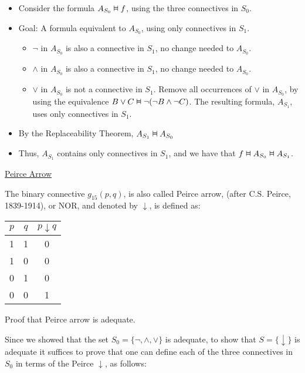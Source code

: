 \documentclass{article}
\newcommand{\vDashv}{%
  \mathrel{%
    \text{%
      \ooalign{$\vDash$\cr\reflectbox{$\vDash$}\cr}%
    }%
  }%
}
\begin{document}
\begin{itemize}
    \item Consider the formula $A_{S_0} \vDashv f$, using the three connectives in $S_0$.
    \item Goal: A formula equivalent to $A_{S_0}$, using only connectives in $S_1$.
        \begin{itemize}
        \item $\neg$ in $A_{S_0}$ is also a connective in $S_1$, no change needed to $A_{S_0}$.
        \item $\wedge$ in $A_{S_0}$ is also a connective in $S_1$, no change needed to $A_{S_0}$.
        \item $\vee$ in $A_{S_0}$ is not a connective in $S_1$. Remove all occurrences of $\vee$ in $A_{S_0}$, by using the equivalence $B \vee C \vDashv \neg(\neg B \wedge \neg C)$. The resulting formula, $A_{S_1}$, uses only connectives in $S_1$.
        \end{itemize}
    \item By the Replaceability Theorem, $A_{S_1} \vDashv A_{S_0}$
    \item Thus, $A_{S_1}$ contains only connectives in $S_1$, and we have that $f \vDashv A_{S_0} \vDashv A_{S_1}$.
\end{itemize}

\underline{Peirce Arrow}

The binary connective $g_{15}(p,q)$, is also called Peirce arrow, (after C.S. Peirce, 1839-1914), or NOR, and denoted by $\downarrow$, is defined as:


\begin{table}[h]
    \centering
    \begin{tabular}{|c|c|c|}\hline
        $p$ & $q$ & $p \downarrow q$\\\hline
         1& 1 & 0\\
         1&  0&0 \\
         0&  1& 0\\
         0& 0 & 1\\\hline
    \end{tabular}
\end{table}

Proof that Peirce arrow is adequate.

Since we showed that the set $S_0 = \{\neg, \wedge, \vee\}$ is adequate, to show that $S = \{\downarrow\}$ is adequate it suffices to prove that one can define each of the three connectives in $S_0$ in terms of the Peirce $\downarrow$, as follows:
\end{document}
